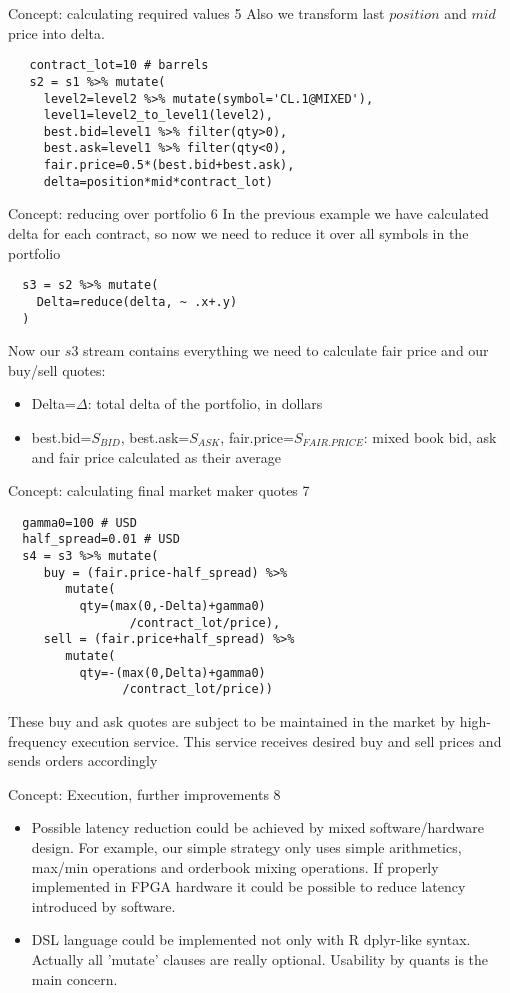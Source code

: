 \documentclass[10pt]{beamer}
\begin{document}
\begin{frame}[fragile]{Concept: calculating required values 5}
Also we transform last $position$ and $mid$  price into delta.
\begin{lstlisting}
   contract_lot=10 # barrels
   s2 = s1 %>% mutate(
     level2=level2 %>% mutate(symbol='CL.1@MIXED'),
     level1=level2_to_level1(level2),
     best.bid=level1 %>% filter(qty>0),
     best.ask=level1 %>% filter(qty<0),
     fair.price=0.5*(best.bid+best.ask),
     delta=position*mid*contract_lot)
\end{lstlisting}
\end{frame}

\begin{frame}[fragile]{Concept: reducing over portfolio 6}
In the previous example we have calculated delta for each contract, so now we need to reduce it over all symbols in the portfolio
\begin{lstlisting}
  s3 = s2 %>% mutate(
    Delta=reduce(delta, ~ .x+.y)
  )
\end{lstlisting}
Now our $s3$ stream contains everything we need to calculate fair price and our buy/sell quotes:
\begin{itemize}
	\item Delta=$\Delta$: total delta of the portfolio, in dollars
	\item best.bid=$S_{BID}$, best.ask=$S_{ASK}$, fair.price=$S_{FAIR.PRICE}$: mixed book bid, ask and fair price calculated as their average
\end{itemize}
\end{frame}

\begin{frame}[fragile]{Concept: calculating final market maker quotes 7}
\begin{lstlisting}
  gamma0=100 # USD
  half_spread=0.01 # USD
  s4 = s3 %>% mutate(
     buy = (fair.price-half_spread) %>% 
        mutate(
          qty=(max(0,-Delta)+gamma0)
                 /contract_lot/price),
     sell = (fair.price+half_spread) %>% 
        mutate(
          qty=-(max(0,Delta)+gamma0)
                /contract_lot/price))
\end{lstlisting}
\end{frame}
These buy and ask quotes are subject to be maintained in the market by high-frequency execution service. This service receives desired buy and sell prices and sends orders accordingly

\begin{frame}{Concept: Execution, further improvements 8}
\begin{itemize}
\item Possible latency reduction could be achieved by mixed software/hardware design. For example, our simple strategy only uses simple arithmetics, max/min operations and orderbook mixing operations. If properly implemented in FPGA hardware it could be possible to reduce latency introduced by software.
\item DSL language could be implemented not only with R dplyr-like syntax. Actually all 'mutate' clauses are really optional. Usability by quants is the main concern.
\end{itemize}
\end{frame}
\end{document}
